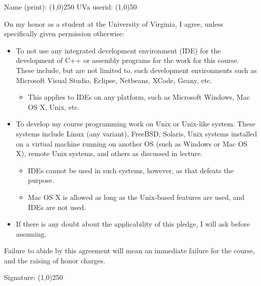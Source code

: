 \documentclass{article}
\begin{document}
\Large

\noindent Name (print): \line(1,0){250} \hspace{0.25in} UVa userid:
\line(1,0){50}

\vspace{0.5in}


\vspace{0.5in}

\noindent On my honor as a student at the University of Virginia, I
agree, unless specifically given permission otherwise:

\begin{itemize}

\item To not use any integrated development environment (IDE) for the
  development of C++ or assembly programs for the work for this
  course. These include, but are not limited to, such development
  environments such as Microsoft Visual Studio, Eclipse, Netbeans,
  XCode, Geany, etc. 

\begin{itemize}

\item This applies to IDEs on any platform, such as Microsoft Windows,
  Mac OS X, Unix, etc.

\end{itemize}

\item To develop my course programming work on Unix or Unix-like
  system. These systems include Linux (any variant), FreeBSD, Solaris,
  Unix systems installed on a virtual machine running on another OS
  (such as Windows or Mac OS X), remote Unix systems, and others as
  discussed in lecture.

\begin{itemize}

\item IDEs cannot be used in such systems, however, as that defeats
  the purpose.

\item Mac OS X is allowed as long as the Unix-based features are used,
  and IDEs are not used.

\end{itemize}

\item If there is any doubt about the applicability of this pledge, I
  will ask before assuming.

\end{itemize}

\vspace{0.25in}

\noindent Failure to abide by this agreement will mean an immediate
failure for the course, and the raising of honor charges.

\vspace{0.5in}

\noindent Signature: \line(1,0){250}
\end{document}
